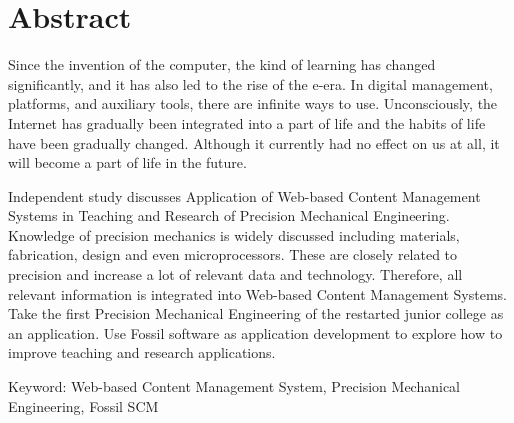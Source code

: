 \chapter*{Abstract}
\renewcommand{\baselinestretch}{1} %
\twelve Since the invention of the computer, the kind of learning has changed significantly, and it has also led to the rise of the e-era. In digital management, platforms, and auxiliary tools, there are infinite ways to use. Unconsciously, the Internet has gradually been integrated into a part of life and the habits of life have been gradually changed. Although it currently had no effect on us at all, it will become a part of life in the future. 
\\
\par
\renewcommand{\baselinestretch}{1}
\twelve Independent study discusses Application of Web-based Content Management Systems in Teaching and Research of Precision Mechanical Engineering. Knowledge of precision mechanics is widely discussed including materials, fabrication, design and even microprocessors. These are closely related to precision and increase a lot of relevant data and technology. Therefore, all relevant information is integrated into Web-based Content Management Systems. Take the first Precision Mechanical Engineering of the restarted junior college as an application. Use Fossil software as application development to explore how to improve teaching and research applications.
\\
\par
\begin{center}
\twelve Keyword: Web-based Content Management System, Precision Mechanical Engineering, Fossil SCM
\end{center}
\par
